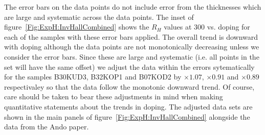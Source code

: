 The error bars on the data points do not include error from the thicknesses which are large and systematic across the data points. The inset of figure~\ref{Fig:ExpH:InvHallCombined} shows the $R_H$ values at \unit{300}{\kelvin} vs. doping for each of the samples with these error bars applied. The overall trend is downward with doping although the data points are not monotonically decreasing unless we consider the error bars. Since these are large and systematic (i.e. all points in the set will have the same offset) we adjust the data within the errors sytematically for the samples B30KUD3, B32KOP1 and B07KOD2 by $\times1.07$, $\times0.91$ and $\times0.89$ respectivaley so that the data follow the monotonic downward trend. Of course, care should be taken to bear these adjustments in mind when making quantitative statements about the trends in doping. The adjusted data sets are shown in the main panels of figure~\ref{Fig:ExpH:InvHallCombined} alongside the data from the Ando paper.

